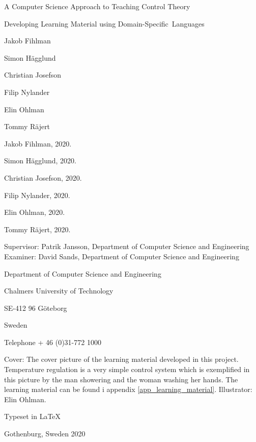\noindent A Computer Science Approach to Teaching Control Theory

\noindent Developing Learning Material using Domain-Specific~Languages

\noindent Jakob Fihlman

\noindent Simon Hägglund

\noindent Christian Josefson

\noindent Filip Nylander

\noindent Elin Ohlman 

\noindent Tommy Räjert

\noindent \vspace{1cm}

\noindent \textcopyright{} Jakob Fihlman, 2020.

\noindent \textcopyright{} Simon Hägglund, 2020.

\noindent \textcopyright{} Christian Josefson, 2020.

\noindent \textcopyright{} Filip Nylander, 2020.

\noindent \textcopyright{} Elin Ohlman, 2020.

\noindent \textcopyright{} Tommy Räjert, 2020.

\noindent \vspace{1cm}

\noindent Supervisor: Patrik Jansson, Department of Computer Science and Engineering
\noindent Examiner: David Sands, Department of Computer Science and Engineering

\vspace{3.5cm}

\noindent Department of Computer Science and Engineering

\noindent Chalmers University of Technology

\noindent SE-412 96 Göteborg

\noindent Sweden

\noindent Telephone + 46 (0)31-772 1000

\vspace{1cm}


\noindent Cover: The cover picture of the learning material developed in this project. Temperature regulation is a very simple control system which is exemplified in this picture by the man showering and the woman washing her hands. The learning material can be found i appendix \ref{app_learning_material}. Illustrator: Elin Ohlman.

\vspace{1cm}

\noindent Typeset in \LaTeX{}

\noindent Gothenburg, Sweden 2020